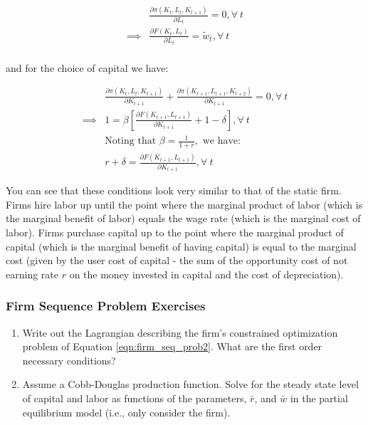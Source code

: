 \documentclass[letterpaper,12pt]{article}
\theoremstyle{definition}
\begin{document}
\begin{spacing}{1.5}
\begin{equation}
\label{eqn:dyn_firm_foc_l}
\begin{split}
&\frac{\partial \pi(K_{t},L_{t},K_{t+1})}{\partial L_{t}} = 0, \forall \ t \\
 \implies & \frac{\partial F(K_{t}, L_{t})}{\partial L_{t}} = \tilde{w}_{t}, \forall \ t \\
\end{split}
\end{equation}

and for the choice of capital we have:

\begin{equation}
\label{eqn:dyn_firm_foc_k}
\begin{split}
&\frac{\partial \pi(K_{t},L_{t},K_{t+1})}{\partial K_{t+1}} + \frac{\partial \pi(K_{t+1},L_{t+1},K_{t+2})}{\partial K_{t+1}} = 0, \forall \ t \\
 \implies & 1 = \beta \left[ \frac{\partial F(K_{t+1}, L_{t+1})}{\partial K_{t+1}}  + 1 - \delta\right], \forall \ t \\
 & \text{Noting that } \beta= \frac{1}{1+r}, \text{ we have: } \\
  & r+\delta =  \frac{\partial F(K_{t+1}, L_{t+1})}{\partial K_{t+1}} , \forall \ t 
\end{split}
\end{equation}

You can see that these conditions look very similar to that of the static firm.  Firms hire labor up until the point where the marginal product of labor (which is the marginal benefit of labor) equals the wage rate (which is the marginal cost of labor).  Firms purchase capital up to the point where the marginal product of capital (which is the marginal benefit of having capital) is equal to the marginal cost (given by the user cost of capital - the sum of the opportunity cost of not earning rate $r$ on the money invested in capital and the cost of depreciation).

\subsubsection*{Firm Sequence Problem Exercises}

\begin{enumerate}
\item Write out the Lagrangian describing the firm's constrained optimization problem of Equation \ref{eqn:firm_seq_prob2}.  What are the first order necessary conditions?
\item Assume a Cobb-Douglas production function.  Solve for the steady state level of capital and labor as functions of the parameters, $\bar{r}$, and $\bar{w}$ in the partial equilibrium model (i.e., only consider the firm).
\end{enumerate}


\end{spacing}
\end{document}
